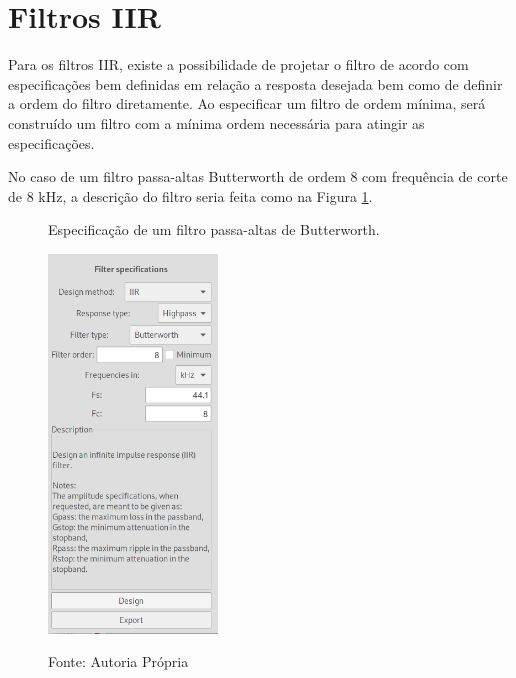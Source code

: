 \documentclass[12pt,a4paper]{report}
\begin{document}
\section{Filtros IIR}
  Para os filtros IIR, existe a possibilidade de projetar o filtro de acordo com especificações bem definidas
  em relação a resposta desejada bem como de definir a ordem do filtro diretamente. Ao especificar um filtro de
  ordem mínima, será construído um filtro com a mínima ordem necessária para atingir as especificações.

  No caso de um filtro passa-altas Butterworth de ordem 8 com frequência de corte de 8 kHz, a descrição do 
  filtro seria feita como na Figura \ref{fig:butter_specifications}.
  \begin{figure}[H]
    \caption{Especificação de um filtro passa-altas de Butterworth.}
    \centering
    \includegraphics[width=0.4\textwidth]{images/butter_specifications}
    \label{fig:butter_specifications}
    \caption*{Fonte: Autoria Própria}
  \end{figure}
\end{document}
